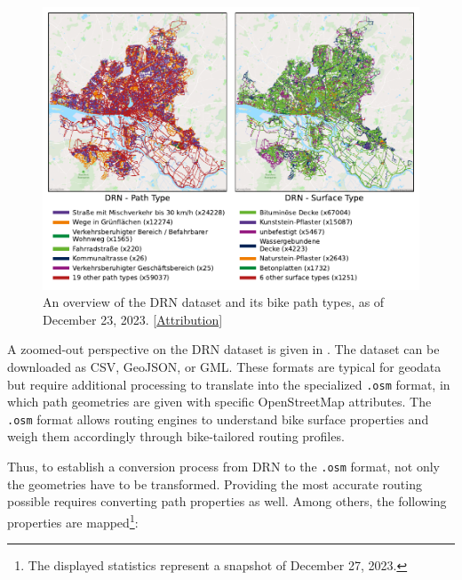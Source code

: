 \begin{figure}[t]
\centering
\includegraphics[width=\linewidth]{images/routing-drn.pdf}
\caption{An overview of the DRN dataset and its bike path types, as of December 23, 2023. [\hyperref[attribution]{Attribution}]}
\label{fig:drn-map}
\end{figure}

A zoomed-out perspective on the DRN dataset is given in . The dataset can be downloaded as CSV, GeoJSON, or GML. These formats are typical for geodata but require additional processing to translate into the specialized \texttt{.osm} format, in which path geometries are given with specific OpenStreetMap attributes. The \texttt{.osm} format allows routing engines to understand bike surface properties and weigh them accordingly through bike-tailored routing profiles.  

Thus, to establish a conversion process from DRN to the \texttt{.osm} format, not only the geometries have to be transformed. Providing the most accurate routing possible requires converting path properties as well. Among others, the following properties are mapped\footnote{The displayed statistics represent a snapshot of December 27, 2023.}:

